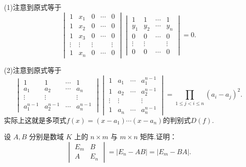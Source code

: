 \begin{sol}
	(1)注意到原式等于
	\[
		\begin{vmatrix}
			1      & x_1    & 0      & \cdots & 0      \\
			1      & x_2    & 0      & \cdots & 0      \\
			1      & x_3    & 0      & \cdots & 0      \\
			\vdots & \vdots & \vdots &        & \vdots \\
			1      & x_n    & 0      & \cdots & 0
		\end{vmatrix}\begin{vmatrix}
			1      & 1      & \cdots & 1      \\
			y_1    & y_2    & \cdots & y_n    \\
			0      & 0      & \cdots & 0      \\
			\vdots & \vdots &        & \vdots \\
			0      & 0      & \cdots & 0
		\end{vmatrix}=0.
	\]

	(2)注意到原式等于
	\[
		\begin{vmatrix}
			1         & 1         & \cdots & 1         \\
			a_1       & a_2       & \cdots & a_n       \\
			\vdots    & \vdots    &        & \vdots    \\
			a_1^{n-1} & a_2^{n-1} & \cdots & a_n^{n-1}
		\end{vmatrix}\begin{vmatrix}
			1      & a_1    & \cdots & a_1^{n-1} \\
			1      & a_2    & \cdots & a_2^{n-1} \\
			\vdots & \vdots &        & \vdots    \\
			1      & a_n    & \cdots & a_n^{n-1}
		\end{vmatrix}=\prod_{1\le j<i\le n}(a_i-a_j)^2.
	\]
	实际上这就是多项式$f(x)=(x-a_1)\cdots(x-a_n)$的判别式$D(f)$.
\end{sol}
\begin{prob}[13]
	设 $A,B$ 分别是数域 $K$ 上的 $n\times m$ 与 $m\times n$ 矩阵.证明：
	\[
		\begin{vmatrix}
			E_m & B   \\
			A   & E_n
		\end{vmatrix}=|E_n-AB|=|E_m-BA|.
	\]
\end{prob}

